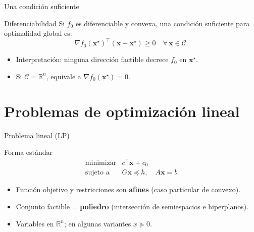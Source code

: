 \documentclass[10pt,aspectratio=169]{beamer}
\newcommand{\R}{\mathbb{R}}
\newcommand{\x}{\mathbf{x}}
\newcommand{\0}{\mathbf{0}}
\begin{document}
\begin{frame}{Una condición suficiente}
  \begin{block}{Diferenciabilidad}
    Si $f_0$ es diferenciable y convexa, una condición suficiente para
    optimalidad global es:
    \[
      \nabla f_0(\x^\star)^\top(\x-\x^\star)\ge 0\quad
      \forall\,\x\in\mathcal{C}.
    \]
  \end{block}
  \begin{itemize}
    \item Interpretación: ninguna dirección factible decrece $f_0$ en $\x^\star$.
    \item Si $\mathcal{C}=\R^n$, equivale a $\nabla f_0(\x^\star)=0$.
  \end{itemize}
\end{frame}

\section{Problemas de optimización lineal}
\begin{frame}{Problema lineal (LP)}
  \begin{block}{Forma estándar}
    \[
      \begin{array}{ll}
        \text{minimizar} & c^\top\x+c_0 \\
        \text{sujeto a}  & G\x\preceq h,\quad A\x=b
      \end{array}
    \]
  \end{block}
  \begin{itemize}
    \item Función objetivo y restricciones son \textbf{afines} (caso particular de convexo).
    \item Conjunto factible = \textbf{poliedro} (intersección de semiespacios e hiperplanos).
    \item Variables en $\R^n$; en algunas variantes $x\succeq 0$.
  \end{itemize}
\end{frame}
\end{document}
